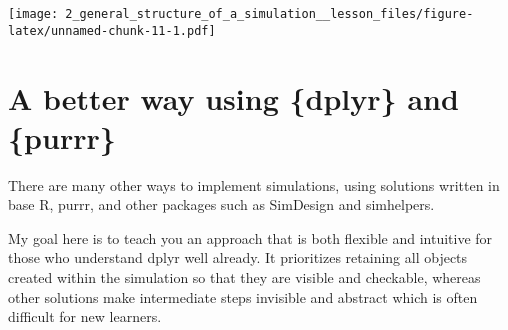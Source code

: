 \documentclass[
]{article}
\begin{document}
\texttt{[image: 2\_general\_structure\_of\_a\_simulation\_\_lesson\_files/figure-latex/unnamed-chunk-11-1.pdf]}

\hypertarget{a-better-way-using-dplyr-and-purrr}{%
\section{A better way using \{dplyr\} and
\{purrr\}}\label{a-better-way-using-dplyr-and-purrr}}

There are many other ways to implement simulations, using solutions
written in base R, purrr, and other packages such as SimDesign and
simhelpers.

My goal here is to teach you an approach that is both flexible and
intuitive for those who understand dplyr well already. It prioritizes
retaining all objects created within the simulation so that they are
visible and checkable, whereas other solutions make intermediate steps
invisible and abstract which is often difficult for new learners.
\end{document}
